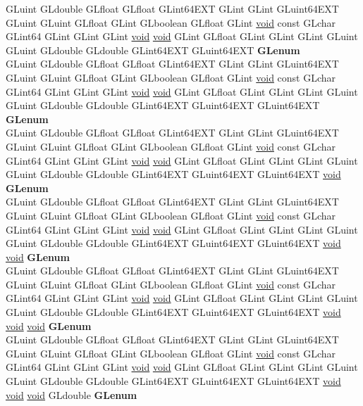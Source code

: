 \begin{DoxyCompactItemize}
\begin{tabbing}
\>GLuint GLdouble GLfloat GLfloat GLint64EXT GLint GLint GLuint64EXT GLuint GLuint GLfloat GLint GLboolean GLfloat GLint \hyperlink{interfacevoid}{void} const GLchar GLint64 GLint GLint GLint \hyperlink{interfacevoid}{void} \hyperlink{interfacevoid}{void} GLint GLfloat GLint GLint GLint GLuint GLuint GLdouble GLdouble GLint64EXT GLuint64EXT {\bfseries GLenum}\\
\>GLuint GLdouble GLfloat GLfloat GLint64EXT GLint GLint GLuint64EXT GLuint GLuint GLfloat GLint GLboolean GLfloat GLint \hyperlink{interfacevoid}{void} const GLchar GLint64 GLint GLint GLint \hyperlink{interfacevoid}{void} \hyperlink{interfacevoid}{void} GLint GLfloat GLint GLint GLint GLuint GLuint GLdouble GLdouble GLint64EXT GLuint64EXT GLuint64EXT {\bfseries GLenum}\\
\>GLuint GLdouble GLfloat GLfloat GLint64EXT GLint GLint GLuint64EXT GLuint GLuint GLfloat GLint GLboolean GLfloat GLint \hyperlink{interfacevoid}{void} const GLchar GLint64 GLint GLint GLint \hyperlink{interfacevoid}{void} \hyperlink{interfacevoid}{void} GLint GLfloat GLint GLint GLint GLuint GLuint GLdouble GLdouble GLint64EXT GLuint64EXT GLuint64EXT \hyperlink{interfacevoid}{void} {\bfseries GLenum}\\
\>GLuint GLdouble GLfloat GLfloat GLint64EXT GLint GLint GLuint64EXT GLuint GLuint GLfloat GLint GLboolean GLfloat GLint \hyperlink{interfacevoid}{void} const GLchar GLint64 GLint GLint GLint \hyperlink{interfacevoid}{void} \hyperlink{interfacevoid}{void} GLint GLfloat GLint GLint GLint GLuint GLuint GLdouble GLdouble GLint64EXT GLuint64EXT GLuint64EXT \hyperlink{interfacevoid}{void} \hyperlink{interfacevoid}{void} {\bfseries GLenum}\\
\>GLuint GLdouble GLfloat GLfloat GLint64EXT GLint GLint GLuint64EXT GLuint GLuint GLfloat GLint GLboolean GLfloat GLint \hyperlink{interfacevoid}{void} const GLchar GLint64 GLint GLint GLint \hyperlink{interfacevoid}{void} \hyperlink{interfacevoid}{void} GLint GLfloat GLint GLint GLint GLuint GLuint GLdouble GLdouble GLint64EXT GLuint64EXT GLuint64EXT \hyperlink{interfacevoid}{void} \hyperlink{interfacevoid}{void} \hyperlink{interfacevoid}{void} {\bfseries GLenum}\\
\>GLuint GLdouble GLfloat GLfloat GLint64EXT GLint GLint GLuint64EXT GLuint GLuint GLfloat GLint GLboolean GLfloat GLint \hyperlink{interfacevoid}{void} const GLchar GLint64 GLint GLint GLint \hyperlink{interfacevoid}{void} \hyperlink{interfacevoid}{void} GLint GLfloat GLint GLint GLint GLuint GLuint GLdouble GLdouble GLint64EXT GLuint64EXT GLuint64EXT \hyperlink{interfacevoid}{void} \hyperlink{interfacevoid}{void} \hyperlink{interfacevoid}{void} GLdouble {\bfseries GLenum}\\

\end{tabbing}
\end{DoxyCompactItemize}
